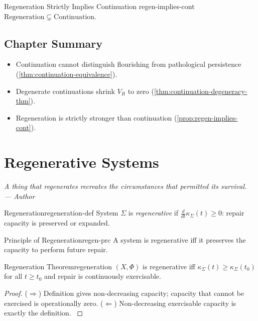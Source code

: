 \documentclass[12pt,twoside,openright]{book}
\newenvironment{epigraph}[2]{%
  \vspace{1em}\begin{flushright}
  \begin{minipage}{0.72\textwidth}
  \itshape\small #1\\[0.4em]
  \upshape\footnotesize\sffamily\color{DistGray}--- #2
  \end{minipage}\end{flushright}\vspace{1.5em}}{}
\newenvironment{chapsummary}{%
  \begin{tcolorbox}[colback=DistBlue!5,colframe=DistBlue,
    title={\faBookOpen\enspace Summary},
    fonttitle=\sffamily\bfseries\color{white},
    attach boxed title to top left={yshift=-2mm,xshift=4mm},
    boxed title style={colback=DistBlue,rounded corners}]
  \begin{itemize}[nosep,leftmargin=*]}{%
  \end{itemize}\end{tcolorbox}}
\newcounter{exercise}[chapter]
\begin{document}
\begin{proposition}{Regeneration Strictly Implies Continuation}%
  {regen-implies-cont}
  $\mathrm{Regeneration}\subsetneq\mathrm{Continuation}$.
\end{proposition}

\section*{Chapter Summary}
\begin{chapsummary}
  \item Continuation cannot distinguish flourishing from
        pathological persistence
        (\cref{thm:continuation-equivalence}).
  \item Degenerate continuations shrink $V_R$ to zero
        (\cref{thm:continuation-degeneracy-thm}).
  \item Regeneration is strictly stronger than continuation
        (\cref{prop:regen-implies-cont}).
\end{chapsummary}

\chapter{Regenerative Systems}
\label{ch:regeneration}
\begin{epigraph}{A thing that regenerates recreates the
  circumstances that permitted its survival.}{Author}
\end{epigraph}

\begin{definition}{Regeneration}{regeneration-def}
  System $\Sigma$ is \emph{regenerative} if
  $\frac{d}{dt}\kappa_\Sigma(t)\ge0$:
  repair capacity is preserved or expanded.
\end{definition}

\begin{principle}{Principle of Regeneration}{regen-prc}
  A system is regenerative iff it preserves the capacity
  to perform future repair.
\end{principle}

\begin{theorem}{Regeneration Theorem}{regeneration}
  $(X,\Phi)$ is regenerative iff
  $\kappa_\Sigma(t)\ge\kappa_\Sigma(t_0)$ for all
  $t\ge t_0$ and repair is continuously exercisable.
\end{theorem}
\begin{proof}
  ($\Rightarrow$) Definition gives non-decreasing capacity;
  capacity that cannot be exercised is operationally zero.
  ($\Leftarrow$) Non-decreasing exercisable capacity
  is exactly the definition.
  \parencite{holling1973,gunderson2002}
\end{proof}
\end{document}
